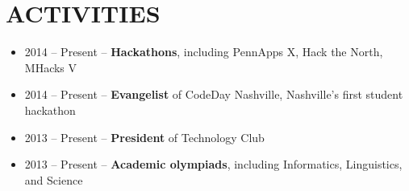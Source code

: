 \documentclass{res}
\begin{document}
\section{ACTIVITIES}

\begin{itemize}
  \item 2014 -- Present -- \textbf{Hackathons}, including PennApps X, Hack the North, MHacks V
  \item 2014 -- Present -- \textbf{Evangelist} of CodeDay Nashville, Nashville's first student hackathon
  \item 2013 -- Present -- \textbf{President} of Technology Club
  \item 2013 -- Present -- \textbf{Academic olympiads}, including Informatics, Linguistics, and Science
\end{itemize}
\end{document}
